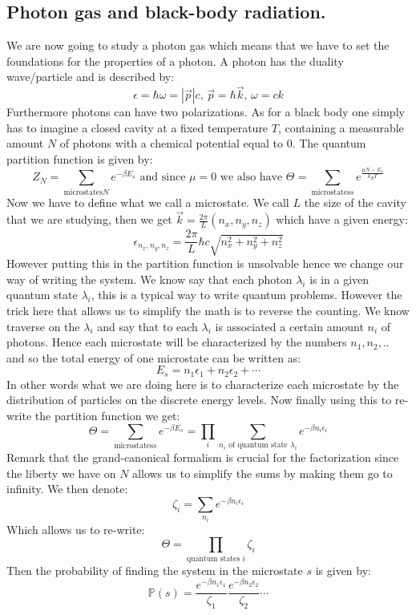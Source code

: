 \documentclass[10pt,a4paper]{book}
\begin{document}
\subsection{Photon gas and black-body radiation.}
We are now going to study a photon gas which means that we have to set the foundations for the properties of a photon. A photon has the duality wave/particle and is described by:
\[
\epsilon = \hbar \omega = |\vec{p}| c, \, \vec{p} = \hbar \vec{k},\, \omega = c k
\]
Furthermore photons can have two polarizations. As for a black body one simply has to imagine a closed cavity at a fixed temperature $T$, containing a measurable amount $N$ of photons with a chemical potential equal to 0. The quantum partition function is given by:
\[
Z_N = \sum_{\text{microstates} N} e^{-\beta E_s} \text{ and since } \mu =0 \text{ we also have } \Theta = \sum_{\text{microstates} s} e^{\frac{\mu N - E_s}{k_B T}}
\] 
Now we have to define what we call a microstate. We call $L$ the size of the cavity that we are studying, then we get $\vec{k} = \frac{2 \pi}{L} (n_x, n_y, n_z)$ which have a given energy:
\[
\epsilon_{n_x,n_y,n_z} = \frac{2\pi}{L} \hbar c\sqrt{n_x^2 + n_y^2 + n_z^2}
\]
However putting this in the partition function is unsolvable hence we change our way of writing the system. We know say that each photon $\lambda_i $ is in a given quantum state $\lambda_i$, this is a typical way to write quantum problems. However the trick here that allows us to simplify the math is to reverse the counting. We know traverse on the $\lambda_i$ and say that to each $\lambda_i$ is associated a certain amount $n_i$ of photons. Hence each microstate will be characterized by the numbers $n_1,n_2,..$ and so the total energy of one microstate can be written as:
\[
E_s = n_1 \epsilon_1 + n_2 \epsilon_2 + \cdots
\]
In other words what we are doing here is to characterize each microstate by the distribution of particles on the discrete energy levels. Now finally using this to re-write the partition function we get:
\[
\Theta = \sum_{\text{microstates} s} e^{-\beta E_s} = \prod_{i} \sum_{n_i \text{ of quantum state } \lambda_i} e^{-\beta n_i \epsilon_i}
\]
Remark that the grand-canonical formalism is crucial for the factorization since the liberty we have on $N$ allows us to simplify the sums by making them go to infinity. We then denote:
\[
\zeta_i = \sum_{n_i} e^{-\beta n_i \epsilon_i}
\]
Which allows us to re-write:
\[
\Theta = \prod_{\text{quantum states } i} \zeta_i
\]
Then the probability of finding the system in the microstate $s$ is given by:
\[
\mathbb{P}(s) = \frac{e^{-\beta n_1 \epsilon_1}}{\zeta_1} \frac{e^{-\beta n_2 \epsilon_2}}{\zeta_2} \cdots
\]
\end{document}
